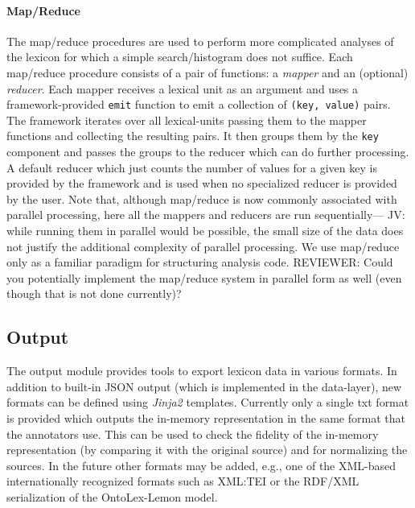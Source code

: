 \documentclass[10pt, a4paper]{article}
\newcommand{\py}[1]{{\tt #1}}
\newcommand{\jv}[1]{{\color{svlinks} JV: #1}}
\newcommand{\rrr}[1]{{\color{red} REVIEWER: #1}}
\begin{document}
\paragraph{Map/Reduce} The map/reduce procedures are used to perform more complicated analyses of the lexicon
for which a simple search/histogram does not suffice. Each map/reduce procedure consists of a pair of functions:
a \emph{mapper} and an (optional) \emph{reducer}. Each mapper receives a lexical unit as an argument and
uses a framework-provided \py{emit} function to emit a collection of \py{(key, value)} pairs. The framework
iterates over all lexical-units passing them to the mapper functions and collecting the resulting pairs. It then groups them by the \py{key} component and passes the groups to the reducer which can do further processing.
A default reducer which just counts the number of values for a given key is provided by the framework and is
used when no specialized reducer is provided by the user. Note that, although map/reduce is now commonly associated with
parallel processing, here all the mappers and reducers are run sequentially---\jv{while running them in parallel would
be possible,} the small size of the data does not justify
the additional complexity of parallel processing. We use map/reduce only as a familiar paradigm for structuring
analysis code.
\rrr{Could you potentially implement the map/reduce system in parallel form as well (even though that is not done currently)?}

\subsection{Output}\label{sec:output}

The output module provides tools to export lexicon data in various formats. In addition to built-in JSON
output (which is implemented in the data-layer), new formats can be defined using \emph{Jinja2} \cite{tool:Jinja2} templates.
Currently only a single txt format is provided which outputs the in-memory representation in the same
format that the annotators use. This can be used to check the fidelity of the in-memory representation
(by comparing it with the original source) and for normalizing the sources. In the future other formats
may be added, e.g.,
one of the XML-based internationally recognized formats such as XML:TEI or the RDF/XML serialization of the OntoLex-Lemon model.

\end{document}
